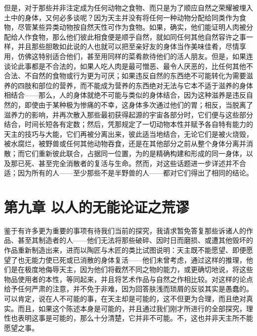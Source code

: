 但是，对于那些并非注定成为任何动物之食物、而只是为了顺应自然之荣耀被埋入土中的身体，又何必多谈呢？因为天主并没有将任何一种动物分配给同类作为食物，尽管某些异类动物按自然天性可作为食物。如果，确实，他们能证明人肉被分配给人作食物，那么他们彼此相食便是顺乎自然，就如同任何其他自然容许之事一样，并且那些胆敢如此说的人也就可以把至亲好友的身体当作美味佳肴，尽情享用，仿佛这特别适合他们，甚至用同样的菜肴款待他们的活人朋友。但是，如果连谈论此事都是不合法的，如果人吃人肉是最可憎恶、最令人厌恶的，比任何其他不合法、不自然的食物或行为更为可厌；如果违反自然的东西绝不可能转化为需要滋养的四肢和部位的营养，而不能成为营养的东西绝对无法与它本不适于滋养的身体相结合——那么，人的身体就绝不可能与类似的身体结合，因为这种滋养是违反自然的，即使由于某种极为惨痛的不幸，这身体多次通过他们的胃；相反，当脱离了滋养力的影响，并再次散入那些最初获得起源的宇宙各部分时，它们便与这些部分结合，时间长短各有定数；然后，凭那规定了一切动物本性并赋予各自特有能力的天主的技巧与大能，它们再被分离出来，彼此适当地结合，无论它们是被火烧毁，被水腐烂，被野兽或任何其他动物吞食，还是在其他部分之前从整个身体分离并消散；而它们重新彼此联合，占据同一位置，为的是精确构建和形成的同一身体，以及那已死、甚至完全消散者的复活与生命。然而，对这些话题进一步详述并不合适；因为所有的人——至少那些不是半野兽的人——都对它们得出了相同的结论。\par


\section{第九章 以人的无能论证之荒谬}

鉴于有许多更为重要的事项有待我们当前的探究，我请求暂免答复那些诉诸人的作品、甚至其制造者的人——他们无法将那些破碎、因时日而磨损、或遭其他毁坏的作品重新制造出来，进而以陶匠与木匠的类比试图说明：天主既不能愿望、即便愿望了也无能力使已死或已消散的身体复活——他们未曾考虑，通过这样的推理，他们是在极度地侮辱天主，因为他们将截然不同之物的能力，或更确切地说，将这些物品使用者的本性，等同起来，并且将艺术作品与自然之作相比较。对这样的论点给予任何严肃的注意，并不免于非难，因为回答肤浅而琐屑的反驳其实是愚蠢的。可以肯定，说在人不可能的事，在天主却是可能的，这不但更为合理，而且绝对真实。而且，如果这个陈述本身是可能的，并且通过我们刚才所进行的全部探究，理性也表明这事是可能的，那么十分清楚，它并非不可能。不，这也并非天主所不能愿望之事。\par


